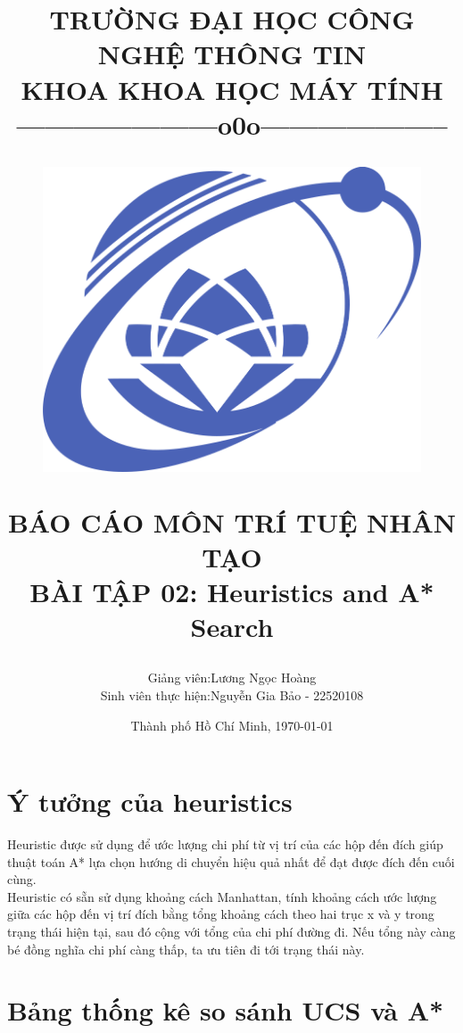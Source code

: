 \documentclass[12pt, letterpaper]{article}
\title{
	\large\textbf{TRƯỜNG ĐẠI HỌC CÔNG NGHỆ THÔNG TIN} \\
	\large\textbf{KHOA KHOA HỌC MÁY TÍNH} \\
	{---------------------o0o--------------------} \\
	\vfill
	\begin{figure}[h]
		\centering 
		\includegraphics[width=0.5\linewidth]{UIT} 
	\end{figure}
	\vfill
	\textbf{BÁO CÁO MÔN TRÍ TUỆ NHÂN TẠO}\\	
	\textbf{BÀI TẬP 02: Heuristics and A* Search} \\
	\vskip 2cm
	\vfill
}
\author{
	\begin{tabular}{r l}
		Giảng viên: &{Lương Ngọc Hoàng} \\
		Sinh viên thực hiện:       &Nguyễn Gia Bảo - 22520108\\
	\end{tabular}
	\vspace{1cm}
}
\date{Thành phố Hồ Chí Minh, {\MakeLowercase{\today}}}
\begin{document}
\maketitle
\pagebreak

\section{Ý tưởng của heuristics}
Heuristic được sử dụng để ước lượng chi phí từ vị trí của các hộp đến
đích giúp thuật toán A* lựa chọn hướng di chuyển hiệu quả nhất để đạt được đích đến cuối cùng. \vspace{3mm} \\
Heuristic có sẵn sử dụng khoảng cách Manhattan, tính khoảng cách ước lượng giữa các hộp đến vị trí đích bằng tổng khoảng cách theo hai trục x và y trong trạng thái hiện tại, sau đó cộng với tổng của chi phí đường đi. Nếu tổng này càng bé đồng nghĩa chi phí càng thấp, ta ưu tiên đi tới trạng thái này.
\section{Bảng thống kê so sánh UCS và A*}
\end{document}

